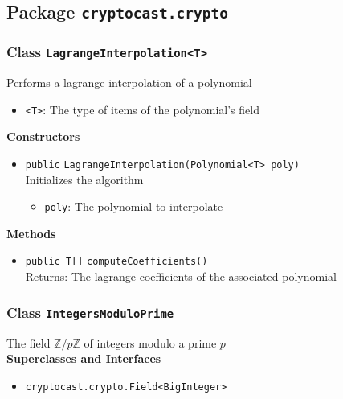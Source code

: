\subsection{Package \lstinline!cryptocast.crypto!}

\subsubsection{Class \lstinline|LagrangeInterpolation<T>|}
Performs a lagrange interpolation of a polynomial \\


\begin{itemize}
\item \lstinline|<T>|: The type of items of the polynomial's field
\end{itemize}


\textbf{Constructors}
\begin{itemize}
\item \lstinline|public| \lstinline|LagrangeInterpolation|\lstinline|(Polynomial<T> poly)|\\
Initializes the algorithm
\begin{itemize}
\item \lstinline|poly|: The polynomial to interpolate
\end{itemize}



\end{itemize}


\textbf{Methods}
\begin{itemize}
\item \lstinline|public T[]| \lstinline|computeCoefficients|\lstinline|()|\\
Returns: The lagrange coefficients of the associated polynomial



\end{itemize}

\subsubsection{Class \lstinline|IntegersModuloPrime|}
The field $\mathbb{Z}/p\mathbb{Z}$ of integers modulo a prime $p$ \\


\textbf{Superclasses and Interfaces}
\begin{itemize}
\item \lstinline|cryptocast.crypto.Field<BigInteger>|
\end{itemize}



